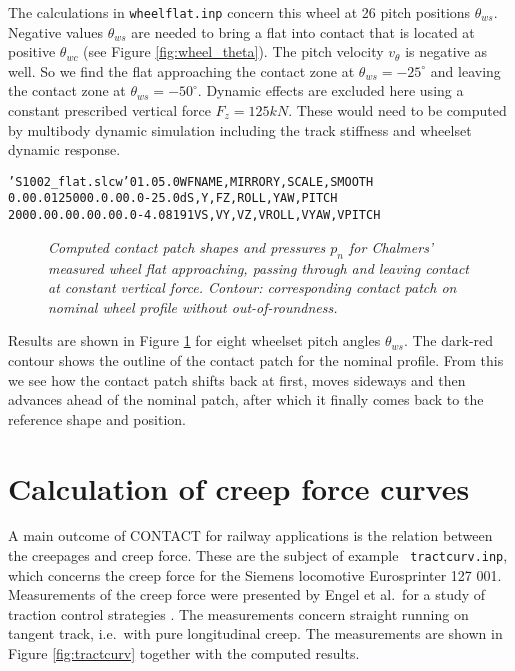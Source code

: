 \documentclass[12pt]{report}
\begin{document}
The calculations in {\tt wheelflat.inp} concern this wheel at 26 pitch
positions $\theta_{ws}$. Negative values $\theta_{ws}$ are needed to bring
a flat into contact that is located at positive $\theta_{wc}$ (see Figure
\ref{fig:wheel_theta}). The pitch velocity $v_\theta$ is negative as well.
So we find the flat approaching the contact zone at $\theta_{ws}=-25^\circ$
and leaving the contact zone at $\theta_{ws}=-50^\circ$. Dynamic effects
are excluded here using a constant prescribed vertical force
$F_z=125\unit{kN}$. These would need to be computed by multibody dynamic
simulation including the track stiffness and wheelset dynamic response.

\begin{alltt}\small
  'S1002_flat.slcw'   0   1.0   5.0               WFNAME, MIRRORY, SCALE, SMOOTH
      0.0   0.0  125000.  0.0   0.0   -25.0d      S, Y, FZ, ROLL, YAW, PITCH
   2000.0   0.0    0.0    0.0   0.0   -4.08191    VS,VY,VZ, VROLL,VYAW,VPITCH
\end{alltt}

\begin{figure}[bt]
\centering
{}
\caption{\em Computed contact patch shapes and pressures $p_n$ for
        Chalmers' measured wheel flat approaching, passing through and
        leaving contact at constant vertical force. Contour: corresponding
        contact patch on nominal wheel profile without out-of-roundness.}
\label{fig:chalmers_pn8x}
\end{figure}

Results are shown in Figure \ref{fig:chalmers_pn8x} for eight wheelset
pitch angles $\theta_{ws}$. The dark-red contour shows the outline of the
contact patch for the nominal profile. From this we see how the contact
patch shifts back at first, moves sideways and then advances ahead of the
nominal patch, after which it finally comes back to the reference shape
and position. 

\section{Calculation of creep force curves}
\label{sec:ex_tractcurv}

A main outcome of CONTACT for railway applications is the relation between
the creepages and creep force. These are the subject of example {\tt
tractcurv.inp}, which concerns the creep force for the Siemens locomotive
Eurosprinter 127 001. Measurements of the creep force were presented by
Engel et al.\ for a study of traction control strategies \cite{Engel1998}.
The measurements concern straight running on tangent track, i.e.\ with pure
longitudinal creep. The measurements are shown in Figure
\ref{fig:tractcurv} together with the computed results.
\end{document}
